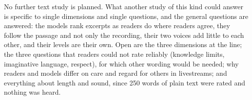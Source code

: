 No further text study is planned. What another study of this kind could answer is specific to single
dimensions and single questions, and the general questions are answered: the models rank excerpts as readers do
where readers agree, they follow the passage and not only the recording, their two voices add little to each
other, and their levels are their own. Open are the three dimensions at the line; the three questions that
readers could not rate reliably (knowledge limits, imaginative language, respect), for which other wording
would be needed; why readers and models differ on care and regard for others in livestreams; and everything
about length and sound, since 250 words of plain text were rated and nothing was heard.
